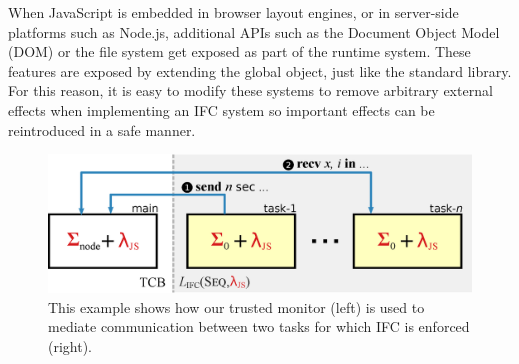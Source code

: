 When JavaScript is embedded in browser layout engines, 
or in server-side platforms such as Node.js,
additional APIs such as the Document Object Model (DOM) or the file
system get exposed as part of the runtime system.
These features are exposed by extending the global object, just like
the standard library.  For this reason, it is easy to modify
these systems to remove arbitrary external effects when implementing
an IFC system so important effects can be reintroduced in a safe manner.


 
\begin{figure}[t]
\centerline{\includegraphics[width=0.7\columnwidth]{figs/node}}
\caption{\label{fig:node}
This example shows how our trusted monitor (left) is used to mediate
communication between two tasks for which IFC is enforced (right).}
\end{figure}
%
